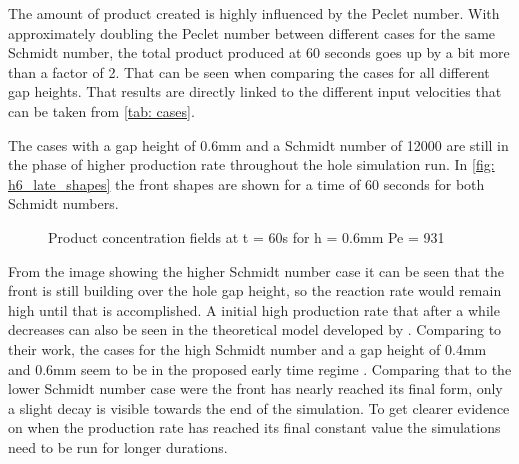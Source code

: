 \documentclass[../thesis.tex]{subfiles}
\begin{document}
The amount of product created is highly influenced by the Peclet number. With approximately doubling the Peclet number between different cases for the same Schmidt number, the total product produced at 60 seconds goes up by a bit more than a factor of 2. That can be seen when comparing the cases for all different gap heights. That results are directly linked to the different input velocities that can be taken from \autoref{tab: cases}.

The cases with a gap height of 0.6mm and a Schmidt number of 12000 are still in the phase of higher production rate throughout the hole simulation run. In \autoref{fig: h6_late_shapes} the front shapes are shown for a time of 60 seconds for both Schmidt numbers.
\begin{figure}[htb]
	\centering
	\qquad
	\caption{Product concentration fields at t = 60s for  h = 0.6mm  Pe = 931}%
	\label{fig: h6_late_shapes}%
\end{figure}
From the image showing the higher Schmidt number case it can be seen that the front is still building over the hole gap height, so the reaction rate would remain high until that is accomplished. A initial high production rate that after a while decreases can also be seen in the theoretical model developed by \cite{comolli2021dynamics}. Comparing to their work, the cases for the high Schmidt number and a gap height of 0.4mm and 0.6mm seem to be in the proposed early time regime \cite{comolli2021dynamics}.
Comparing that to the lower Schmidt number case were the front has nearly reached its final form, only a slight decay is visible towards the end of the simulation. To get clearer evidence on when the production rate has reached its final constant value the simulations need to be run for longer durations.
\end{document}
